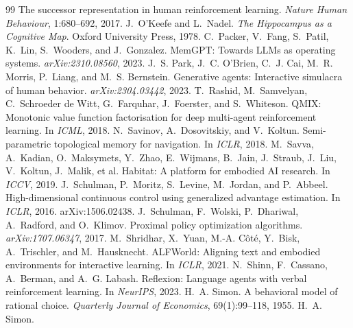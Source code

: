 \documentclass{article}
\begin{document}
\begin{thebibliography}{99}
\newblock The successor representation in human reinforcement learning.
\newblock \emph{Nature Human Behaviour}, 1:680--692, 2017.
J.~O'Keefe and L.~Nadel.
\newblock \emph{The Hippocampus as a Cognitive Map}.
\newblock Oxford University Press, 1978.
C.~Packer, V.~Fang, S.~Patil, K.~Lin, S.~Wooders, and J.~Gonzalez.
\newblock MemGPT: Towards LLMs as operating systems.
\newblock \emph{arXiv:2310.08560}, 2023.
J.~S. Park, J.~C. O'Brien, C.~J. Cai, M.~R. Morris, P.~Liang, and M.~S. Bernstein.
\newblock Generative agents: Interactive simulacra of human behavior.
\newblock \emph{arXiv:2304.03442}, 2023.
T.~Rashid, M.~Samvelyan, C.~Schroeder de Witt, G.~Farquhar, J.~Foerster, and S.~Whiteson.
\newblock QMIX: Monotonic value function factorisation for deep multi-agent reinforcement learning.
\newblock In \emph{ICML}, 2018.
N.~Savinov, A.~Dosovitskiy, and V.~Koltun.
\newblock Semi-parametric topological memory for navigation.
\newblock In \emph{ICLR}, 2018.
M.~Savva, A.~Kadian, O.~Maksymets, Y.~Zhao, E.~Wijmans, B.~Jain, J.~Straub, J.~Liu, V.~Koltun, J.~Malik, et al.
\newblock Habitat: A platform for embodied AI research.
\newblock In \emph{ICCV}, 2019.
J.~Schulman, P.~Moritz, S.~Levine, M.~Jordan, and P.~Abbeel.
\newblock High-dimensional continuous control using generalized advantage estimation.
\newblock In \emph{ICLR}, 2016.
\newblock arXiv:1506.02438.
J.~Schulman, F.~Wolski, P.~Dhariwal, A.~Radford, and O.~Klimov.
\newblock Proximal policy optimization algorithms.
\newblock \emph{arXiv:1707.06347}, 2017.
M.~Shridhar, X.~Yuan, M.-A. C\^ot\'e, Y.~Bisk, A.~Trischler, and M.~Hausknecht.
\newblock ALFWorld: Aligning text and embodied environments for interactive learning.
\newblock In \emph{ICLR}, 2021.
N.~Shinn, F.~Cassano, A.~Berman, and A.~G. Labash.
\newblock Reflexion: Language agents with verbal reinforcement learning.
\newblock In \emph{NeurIPS}, 2023.
H.~A. Simon.
\newblock A behavioral model of rational choice.
\newblock \emph{Quarterly Journal of Economics}, 69(1):99--118, 1955.
H.~A. Simon.

\end{thebibliography}
\end{document}
